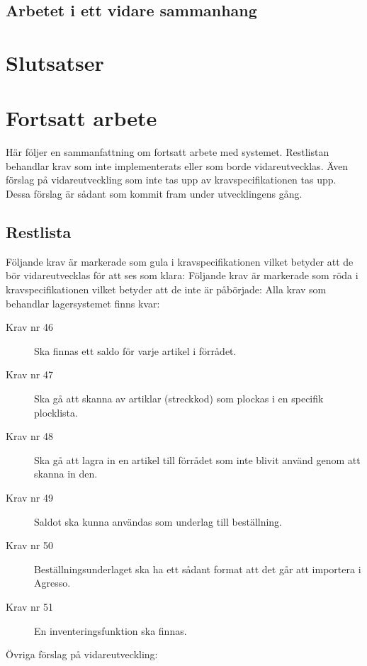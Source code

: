 \documentclass{article}
\begin{document}
\subsection{Arbetet i ett vidare sammanhang}

\section{Slutsatser}
   
\section{Fortsatt arbete}
Här följer en sammanfattning om fortsatt arbete med systemet. Restlistan behandlar krav som inte implementerats eller som borde vidareutvecklas. Även förslag på vidareutveckling som inte tas upp av kravspecifikationen tas upp. Dessa förslag är sådant som kommit fram under utvecklingens gång.

\subsection{Restlista}
Följande krav är markerade som gula i kravspecifikationen vilket betyder att de bör vidareutvecklas för att ses som klara:
Följande krav är markerade som röda i kravspecifikationen vilket betyder att de inte är påbörjade:
Alla krav som behandlar lagersystemet finns kvar:
\begin{description}
\item[Krav nr 46] Ska finnas ett saldo för varje artikel i förrådet.
\item[Krav nr 47] Ska gå att skanna av artiklar (streckkod) som plockas i en specifik plocklista.
\item[Krav nr 48] Ska gå att lagra in en artikel till förrådet som inte blivit använd genom att skanna in den.
\item[Krav nr 49] Saldot ska kunna användas som underlag till beställning.
\item[Krav nr 50] Beställningsunderlaget ska ha ett sådant format att det går att importera i Agresso.
\item[Krav nr 51] En inventeringsfunktion ska finnas.
\end{description}

Övriga förslag på vidareutveckling:
\end{document}

